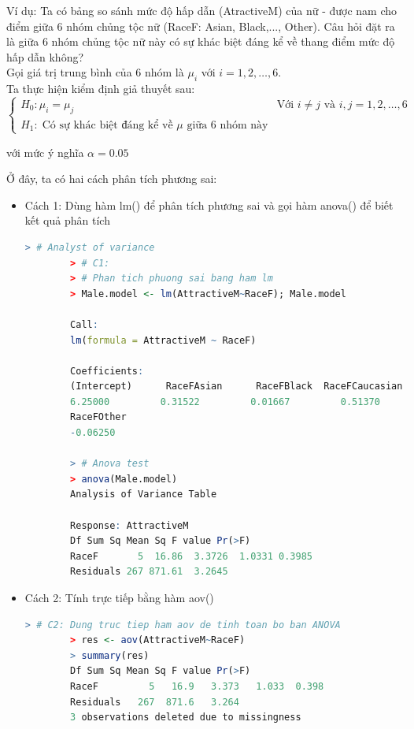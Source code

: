 \documentclass[a4paper,12pt]{article}
\begin{document}
	Ví dụ: Ta có bảng so sánh mức độ hấp dẫn (AtractiveM) của nữ - được nam cho điểm giữa 6 nhóm chủng tộc nữ (RaceF: Asian, Black,..., Other). Câu hỏi đặt ra là giữa 6 nhóm chủng tộc nữ này có sự khác biệt đáng kể về thang điểm mức độ hấp dẫn không?\\
	
	Gọi giá trị trung bình của 6 nhóm là $\mu_i$ với $i = 1, 2, \dots, 6$.\\
	
	Ta thực hiện kiểm định giả thuyết sau:
	\begin{equation*}
	\begin{cases}
	H_0: \mu_i = \mu_j & \text{Với $i \neq j$ và $i, j = 1, 2, \dots, 6$}\\
	H_1: \;\text{Có sự khác biệt đáng kể về $\mu$ giữa 6 nhóm này}
	\end{cases}
	\end{equation*}
	
	với mức ý nghĩa $\alpha = 0.05$
	
	Ở đây, ta có hai cách phân tích phương sai:
	\begin{itemize}
		\item Cách 1: Dùng hàm lm() để phân tích phương sai và gọi hàm anova() để biết kết quả phân tích
		\begin{lstlisting}[language = R]
		> # Analyst of variance
		> # C1:
		> # Phan tich phuong sai bang ham lm
		> Male.model <- lm(AttractiveM~RaceF); Male.model
		
		Call:
		lm(formula = AttractiveM ~ RaceF)
		
		Coefficients:
		(Intercept)      RaceFAsian      RaceFBlack  RaceFCaucasian     RaceFLatino  
		6.25000         0.31522         0.01667         0.51370         1.01087  
		RaceFOther  
		-0.06250  
		
		> # Anova test
		> anova(Male.model)
		Analysis of Variance Table
		
		Response: AttractiveM
		Df Sum Sq Mean Sq F value Pr(>F)
		RaceF       5  16.86  3.3726  1.0331 0.3985
		Residuals 267 871.61  3.2645
		\end{lstlisting}
		\item Cách 2: Tính trực tiếp bằng hàm aov()
		\begin{lstlisting}[language=R]
		> # C2: Dung truc tiep ham aov de tinh toan bo ban ANOVA
		> res <- aov(AttractiveM~RaceF)
		> summary(res)
		Df Sum Sq Mean Sq F value Pr(>F)
		RaceF         5   16.9   3.373   1.033  0.398
		Residuals   267  871.6   3.264               
		3 observations deleted due to missingness
		\end{lstlisting}
	\end{itemize}
	
\end{document}
